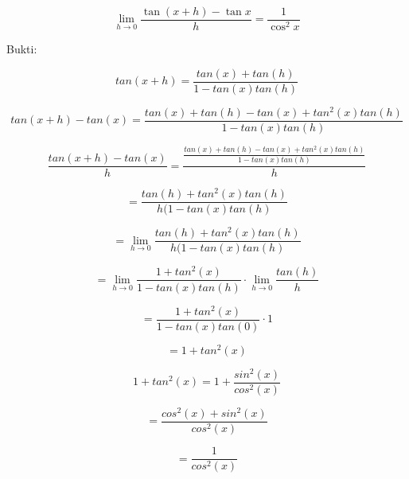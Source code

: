 \documentclass[a4paper,10pt]{article}
\begin{document}
\begin{eulernotebook}
\begin{eulercomment}
\begin{eulercomment}
\begin{eulerprompt}
\end{eulerprompt}
\begin{eulerformula}
\[
\lim_{h\rightarrow 0}{\frac{\tan \left(x+h\right)-\tan x}{h}}=  \frac{1}{\cos ^2x}
\]
\end{eulerformula}
\begin{eulercomment}
Bukti:\\
\end{eulercomment}
\begin{eulerformula}
\[
tan(x+h) = \frac {tan (x)+tan (h)}{1-tan(x)tan(h)}
\]
\end{eulerformula}
\begin{eulerformula}
\[
tan(x+h)-tan (x) ={\frac {tan (x)+tan (h)-tan (x)+tan^2(x)tan(h)}{1-tan(x)tan(h)}}
\]
\end{eulerformula}
\begin{eulerformula}
\[
\frac{tan(x+h)-tan (x)}{h} =\frac{\frac{tan(x)+tan(h)-tan(x)+tan^2(x)tan(h)}{1-tan(x)tan(h)}}{h}
\]
\end{eulerformula}
\begin{eulerformula}
\[
= \frac {tan(h)+tan^2(x)tan(h)}{h(1-tan(x)tan(h)}
\]
\end{eulerformula}
\begin{eulerformula}
\[
= \lim_{h\to 0} \frac{tan(h)+tan^2(x) tan(h)}{h(1-tan(x)tan(h)}
\]
\end{eulerformula}
\begin{eulerformula}
\[
= \lim_{h\to 0} \frac{1 +tan^2(x)}{1-tan (x)tan(h)}\cdot\lim_{h\to 0} \frac{tan (h)}{h}
\]
\end{eulerformula}
\begin{eulerformula}
\[
= \frac{1 +tan^2(x)}{1-tan (x)tan(0)}\cdot 1
\]
\end{eulerformula}
\begin{eulerformula}
\[
= 1+tan^2(x)
\]
\end{eulerformula}
\begin{eulercomment}
\end{eulercomment}
\begin{eulerformula}
\[
1+tan^2(x)=1+\frac{sin^2(x)}{cos^2(x)}
\]
\end{eulerformula}
\begin{eulerformula}
\[
= \frac{cos^2(x) + sin^2(x)}{cos^2(x)}
\]
\end{eulerformula}
\begin{eulerformula}
\[
= \frac{1}{cos^2(x)}
\]
\end{eulerformula}
\end{eulercomment}
\end{eulercomment}
\end{eulernotebook}
\end{document}

